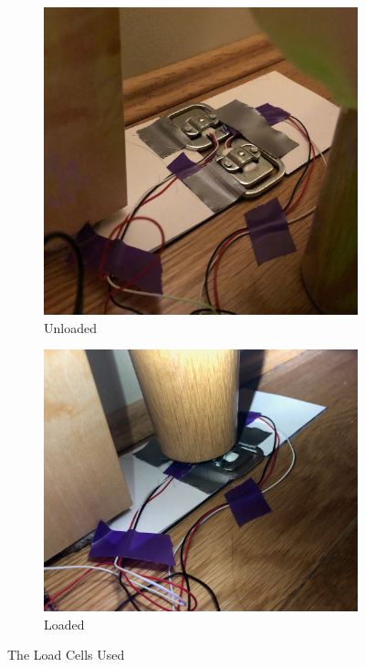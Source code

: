 \documentclass[11pt]{article}
\begin{document}
\begin{figure}[H]
	\centering
	\begin{subfigure}[]{0.4\textwidth}
		\centering
		\includegraphics[width = \linewidth]{unloadedCells}
		\caption{Unloaded}
	\end{subfigure}
	\hfill
	\begin{subfigure}[]{0.4\textwidth}
		\centering
		\includegraphics[width = \linewidth]{loadedCells}
		\caption{Loaded}
	\end{subfigure}
	\caption{The Load Cells Used}
	\label{fig:mechmount}
\end{figure}
\end{document}
